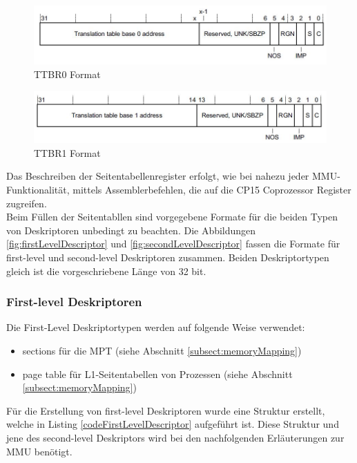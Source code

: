 \begin{figure}[H]
	\includegraphics[scale=0.8]{figures/ttbr0format}
	\caption{TTBR0 Format \cite[S. B4-1726]{ARM:ARM}}
	\label{fig:TTBR0Format}
\end{figure}


\begin{figure}[H]
	\includegraphics[scale=0.8]{figures/ttbr1format}
	\caption{TTBR1 Format \cite[S. B4-1730]{ARM:ARM}}
	\label{fig:TTBR1Format}
\end{figure}

Das Beschreiben der Seitentabellenregister erfolgt, wie bei nahezu jeder MMU-Funktionalität, mittels Assemblerbefehlen, die auf die CP15 Coprozessor Register zugreifen.\\

Beim Füllen der Seitentabllen sind vorgegebene Formate für die beiden Typen von Deskriptoren unbedingt zu beachten. Die Abbildungen \ref{fig:firstLevelDescriptor} und \ref{fig:secondLevelDescriptor} fassen die Formate für first-level und second-level Deskriptoren zusammen. Beiden Deskriptortypen gleich ist die vorgeschriebene Länge von 32 bit.\\

\subsubsection*{First-level Deskriptoren}

Die First-Level Deskriptortypen werden auf folgende Weise verwendet:

\begin{itemize}
	\item sections für die \ac{MPT} (siehe Abschnitt \ref{subsect:memoryMapping}) 
	\item page table für L1-Seitentabellen von Prozessen (siehe Abschnitt \ref{subsect:memoryMapping})
\end{itemize}

Für die Erstellung von first-level Deskriptoren wurde eine Struktur erstellt, welche in Listing \ref{codeFirstLevelDescriptor} aufgeführt ist. Diese Struktur und jene des second-level Deskriptors wird bei den nachfolgenden Erläuterungen zur MMU benötigt.\\

